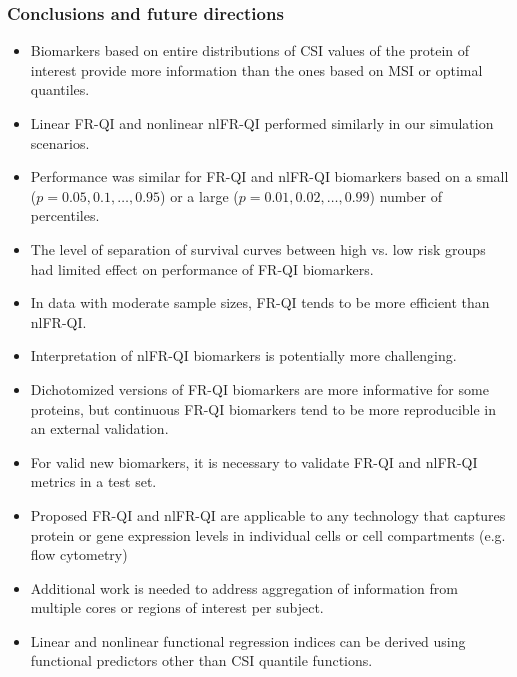 \documentclass[t,8pt]{beamer}
\begin{document}
	\frame
	{\frametitle {Conclusions and future directions}  
	 \begin{itemize}
     \item Biomarkers based on entire distributions of CSI values of the protein of interest provide more information than the ones based on MSI or optimal quantiles.
     	\item Linear FR-QI and nonlinear nlFR-QI performed similarly in our simulation scenarios. 
	\item Performance was similar for FR-QI and nlFR-QI biomarkers based on a small ($p=0.05, 0.1, \dots, 0.95$) 
	 or a large ($p=0.01, 0.02, \dots, 0.99$) number of percentiles.
	 \item The level of separation of survival curves between high vs. low risk groups had limited effect on performance of FR-QI biomarkers.
	\item In data with moderate sample sizes, FR-QI tends to be more efficient than nlFR-QI.
		\item Interpretation of nlFR-QI biomarkers is potentially more challenging.
	\item Dichotomized versions of FR-QI biomarkers are more informative for some proteins, but continuous FR-QI biomarkers tend to be more reproducible in an external validation. 
	 \item For valid new biomarkers, it is necessary to validate FR-QI and nlFR-QI metrics in a test set. 
	 	\color{red}
	 	 \item Proposed  FR-QI and nlFR-QI are applicable to any technology that captures protein or gene expression levels in individual cells or cell compartments (e.g. flow cytometry)
	 	\color{blue}
	\item  Additional work is needed to address aggregation of information from multiple cores or regions of interest per subject. 
        \item  Linear and nonlinear functional regression indices can be derived using functional predictors other than CSI quantile functions.
          \end{itemize}  
	}
\end{document}
